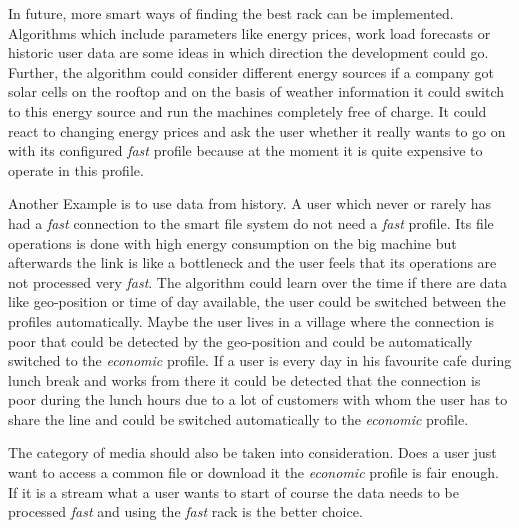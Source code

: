 \label{sec:outlook}
In future, more smart ways of finding the best rack can be implemented. Algorithms which include parameters like energy prices, work load forecasts or historic user data are some ideas in which direction the development could go. Further, the algorithm could consider different energy sources if a company got solar cells on the rooftop and on the basis of weather information it could switch to this energy source and run the machines completely free of charge. It could react to changing energy prices and ask the user whether it really wants to go on with its configured \textit{fast} profile because at the moment it is quite expensive to operate in this profile.

Another Example is to use data from history. A user which never or rarely has had a \textit{fast} connection to the smart file system do not need a \textit{fast} profile. Its file operations is done with high energy consumption on the big machine but afterwards the link is like a bottleneck and the user feels that its operations are not processed very \textit{fast}. The algorithm could learn over the time if there are data like geo-position or time of day available, the user could be switched between the profiles automatically. Maybe the user lives in a village where the connection is poor that could be detected by the geo-position and could be automatically switched to the \textit{economic} profile. If a user is every day in his favourite cafe during lunch break and works from there it could be detected that the connection is poor during the lunch hours due to a lot of customers with whom the user has to share the line and could be switched automatically to the \textit{economic} profile.

The category of media should also be taken into consideration. Does a user just want to access a common file or download it the \textit{economic} profile is fair enough. If it is a stream what a user wants to start of course the data needs to be processed \textit{fast} and using the \textit{fast} rack is the better choice.
